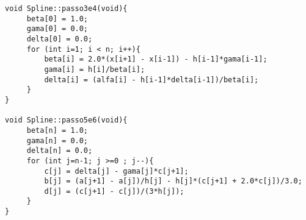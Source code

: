 \begin{verbatim}
void Spline::passo3e4(void){ 
     beta[0] = 1.0;
     gama[0] = 0.0;
     delta[0] = 0.0;
     for (int i=1; i < n; i++){
         beta[i] = 2.0*(x[i+1] - x[i-1]) - h[i-1]*gama[i-1];
         gama[i] = h[i]/beta[i];
         delta[i] = (alfa[i] - h[i-1]*delta[i-1])/beta[i];
     }
}

void Spline::passo5e6(void){ 
     beta[n] = 1.0;
     gama[n] = 0.0;
     delta[n] = 0.0;
     for (int j=n-1; j >=0 ; j--){
         c[j] = delta[j] - gama[j]*c[j+1];
         b[j] = (a[j+1] - a[j])/h[j] - h[j]*(c[j+1] + 2.0*c[j])/3.0;
         d[j] = (c[j+1] - c[j])/(3*h[j]);
     }
}

\end{verbatim}